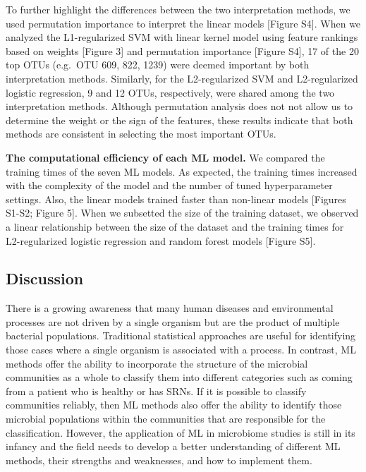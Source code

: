 \documentclass[11pt,]{article}
\begin{document}
To further highlight the differences between the two interpretation
methods, we used permutation importance to interpret the linear models
{[}Figure S4{]}. When we analyzed the L1-regularized SVM with linear
kernel model using feature rankings based on weights {[}Figure 3{]} and
permutation importance {[}Figure S4{]}, 17 of the 20 top OTUs (e.g.~OTU
609, 822, 1239) were deemed important by both interpretation methods.
Similarly, for the L2-regularized SVM and L2-regularized logistic
regression, 9 and 12 OTUs, respectively, were shared among the two
interpretation methods. Although permutation analysis does not not allow
us to determine the weight or the sign of the features, these results
indicate that both methods are consistent in selecting the most
important OTUs.

\textbf{The computational efficiency of each ML model.} We compared the
training times of the seven ML models. As expected, the training times
increased with the complexity of the model and the number of tuned
hyperparameter settings. Also, the linear models trained faster than
non-linear models {[}Figures S1-S2; Figure 5{]}. When we subsetted the
size of the training dataset, we observed a linear relationship between
the size of the dataset and the training times for L2-regularized
logistic regression and random forest models {[}Figure S5{]}.

\subsection{Discussion}\label{discussion}

There is a growing awareness that many human diseases and environmental
processes are not driven by a single organism but are the product of
multiple bacterial populations. Traditional statistical approaches are
useful for identifying those cases where a single organism is associated
with a process. In contrast, ML methods offer the ability to incorporate
the structure of the microbial communities as a whole to classify them
into different categories such as coming from a patient who is healthy
or has SRNs. If it is possible to classify communities reliably, then ML
methods also offer the ability to identify those microbial populations
within the communities that are responsible for the classification.
However, the application of ML in microbiome studies is still in its
infancy and the field needs to develop a better understanding of
different ML methods, their strengths and weaknesses, and how to
implement them.
\end{document}

